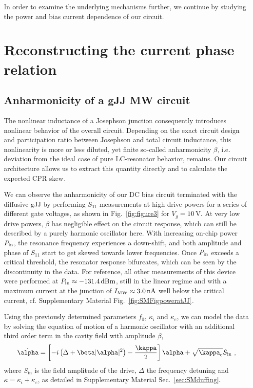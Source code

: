In order to examine the underlying mechanisms further, we continue by studying the power and bias current dependence of our circuit.



\section{Reconstructing the current phase relation}

\subsection{Anharmonicity of a gJJ MW circuit}

The nonlinear inductance of a Josephson junction consequently introduces nonlinear behavior of the overall circuit.
%
Depending on the exact circuit design and participation ratio between Josephson and total circuit inductance, this nonlinearity is more or less diluted, yet finite so-called anharmonicity $\beta$, i.e. deviation from the ideal case of pure LC-resonator behavior, remains.
%
Our circuit architecture allows us to extract this quantity directly and to calculate the expected CPR skew.

We can observe the anharmonicity of our DC bias circuit terminated with the diffusive gJJ by performing $S_{11}$ measurements at high drive powers for a series of different gate voltages, as shown in Fig.~\ref{fig:figure3} for $V_g=\SI{+10}{\volt}$.
%
At very low drive powers, $\beta$ has negligible effect on the circuit response, which can still be described by a purely harmonic oscillator here.
%
With increasing on-chip power $P_{\rm in}$, the resonance frequency experiences a down-shift, and both amplitude and phase of $S_{11}$ start to get skewed towards lower frequencies.
%
Once $P_{\rm in}$ exceeds a critical threshold, the resonator response bifurcates, which can be seen by the discontinuity in the data.
%
For reference, all other measurements of this device were performed at $P_{\rm in}\approx\SI{-131.4}{dBm}$, still in the linear regime and with a maximum current at the junction of $I_{\rm MW}\approx\SI{3.0}{\nano\ampere}$ well below the critical current, cf. Supplementary Material Fig.~\ref{fig:SMFigpoweratJJ}.

Using the previously determined parameters $f_0$, $\kappa_i$ and $\kappa_e$, we can model the data by solving the equation of motion of a harmonic oscillator with an additional third order term in the cavity field with amplitude $\beta$, 
%
\begin{align}
\dot{\alpha} = \left[ -i \left( \Delta+\beta\abs{\alpha}^2 \right)-\frac{\kappa}{2} \right]\alpha + \sqrt{\kappa_\text{e}} S_\text{in}\ ,
\label{eq:Duffing-EOM}
\end{align}
%
where $S_\text{in}$ is the field amplitude of the drive, $\Delta$ the frequency detuning and $\kappa=\kappa_i+\kappa_e$, as detailed in Supplementary Material Sec.~\ref{sec:SMduffing}.


